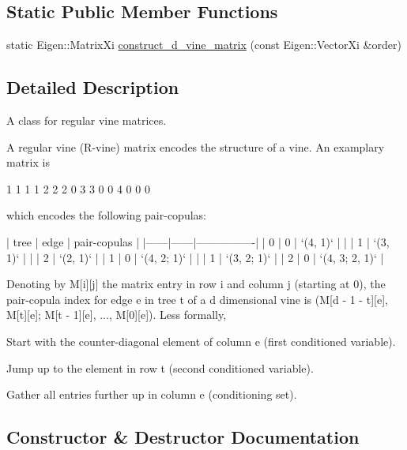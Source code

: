 \subsection*{Static Public Member Functions}
\begin{DoxyCompactItemize}
\item 
static Eigen\+::\+Matrix\+Xi \hyperlink{classvinecopulib_1_1_r_vine_matrix_a7b3c8952acd3a29559369f0fae0ad9b3}{construct\+\_\+d\+\_\+vine\+\_\+matrix} (const Eigen\+::\+Vector\+Xi \&order)
\end{DoxyCompactItemize}


\subsection{Detailed Description}
A class for regular vine matrices. 

A regular vine (R-\/vine) matrix encodes the structure of a vine. An examplary matrix is 
\begin{DoxyCode}
1 1 1 1
2 2 2 0
3 3 0 0
4 0 0 0
\end{DoxyCode}
 which encodes the following pair-\/copulas\+: 
\begin{DoxyCode}
| tree | edge | pair-copulas   |
|------|------|----------------|
| 0    | 0    | `(4, 1)`       |
|      | 1    | `(3, 1)`       |
|      | 2    | `(2, 1)`       |
| 1    | 0    | `(4, 2; 1)`    |
|      | 1    | `(3, 2; 1)`    |
| 2    | 0    | `(4, 3; 2, 1)` |
\end{DoxyCode}
 Denoting by {\ttfamily M\mbox{[}i\mbox{]}\mbox{[}j\mbox{]}} the matrix entry in row {\ttfamily i} and column {\ttfamily j} (starting at 0), the pair-\/copula index for edge {\ttfamily e} in tree {\ttfamily t} of a {\ttfamily d} dimensional vine is {\ttfamily (M\mbox{[}d -\/ 1 -\/ t\mbox{]}\mbox{[}e\mbox{]}, M\mbox{[}t\mbox{]}\mbox{[}e\mbox{]}; M\mbox{[}t -\/ 1\mbox{]}\mbox{[}e\mbox{]}, ..., M\mbox{[}0\mbox{]}\mbox{[}e\mbox{]})}. Less formally,
\begin{DoxyEnumerate}
\item Start with the counter-\/diagonal element of column {\ttfamily e} (first conditioned variable).
\item Jump up to the element in row {\ttfamily t} (second conditioned variable).
\item Gather all entries further up in column {\ttfamily e} (conditioning set). 
\end{DoxyEnumerate}

\subsection{Constructor \& Destructor Documentation}
